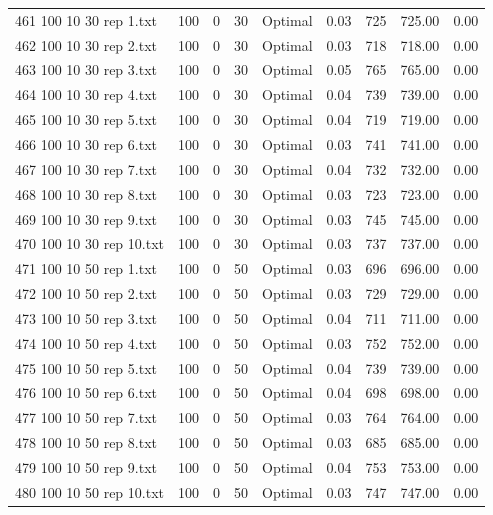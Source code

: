 \begin{longtable}{lrrllrrrr}
461 100 10 30 rep 1.txt & 100 & 0 & 30 & Optimal &  0.03 & 725 & 725.00 &  0.00\\
462 100 10 30 rep 2.txt & 100 & 0 & 30 & Optimal &  0.03 & 718 & 718.00 &  0.00\\
463 100 10 30 rep 3.txt & 100 & 0 & 30 & Optimal &  0.05 & 765 & 765.00 &  0.00\\
464 100 10 30 rep 4.txt & 100 & 0 & 30 & Optimal &  0.04 & 739 & 739.00 &  0.00\\
465 100 10 30 rep 5.txt & 100 & 0 & 30 & Optimal &  0.04 & 719 & 719.00 &  0.00\\
466 100 10 30 rep 6.txt & 100 & 0 & 30 & Optimal &  0.03 & 741 & 741.00 &  0.00\\
467 100 10 30 rep 7.txt & 100 & 0 & 30 & Optimal &  0.04 & 732 & 732.00 &  0.00\\
468 100 10 30 rep 8.txt & 100 & 0 & 30 & Optimal &  0.03 & 723 & 723.00 &  0.00\\
469 100 10 30 rep 9.txt & 100 & 0 & 30 & Optimal &  0.03 & 745 & 745.00 &  0.00\\
470 100 10 30 rep 10.txt & 100 & 0 & 30 & Optimal &  0.03 & 737 & 737.00 &  0.00\\
471 100 10 50 rep 1.txt & 100 & 0 & 50 & Optimal &  0.03 & 696 & 696.00 &  0.00\\
472 100 10 50 rep 2.txt & 100 & 0 & 50 & Optimal &  0.03 & 729 & 729.00 &  0.00\\
473 100 10 50 rep 3.txt & 100 & 0 & 50 & Optimal &  0.04 & 711 & 711.00 &  0.00\\
474 100 10 50 rep 4.txt & 100 & 0 & 50 & Optimal &  0.03 & 752 & 752.00 &  0.00\\
475 100 10 50 rep 5.txt & 100 & 0 & 50 & Optimal &  0.04 & 739 & 739.00 &  0.00\\
476 100 10 50 rep 6.txt & 100 & 0 & 50 & Optimal &  0.04 & 698 & 698.00 &  0.00\\
477 100 10 50 rep 7.txt & 100 & 0 & 50 & Optimal &  0.03 & 764 & 764.00 &  0.00\\
478 100 10 50 rep 8.txt & 100 & 0 & 50 & Optimal &  0.03 & 685 & 685.00 &  0.00\\
479 100 10 50 rep 9.txt & 100 & 0 & 50 & Optimal &  0.04 & 753 & 753.00 &  0.00\\
480 100 10 50 rep 10.txt & 100 & 0 & 50 & Optimal &  0.03 & 747 & 747.00 &  0.00\\
\end{longtable}

